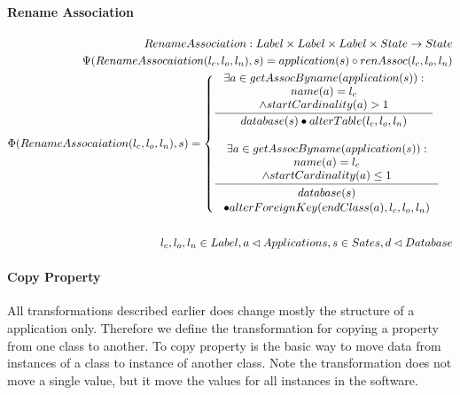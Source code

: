\documentclass[11pt]{article}
\begin{document}
\paragraph{Rename Association}
\begin{align*}
RenameAssociation : Label \times Label \times Label \times State \rightarrow State \\
\Psi(RenameAssocaiation(l_c, l_o, l_n), s) = application(s) \circ renAssoc(l_c, l_o, l_n)\\
\Phi(RenameAssocaiation(l_c, l_o, l_n), s) = \begin{cases}
	\inference{\exists a  \in getAssocByname(application(s)) : \\
  name(a) = l_c \\ \wedge startCardinality(a) > 1 }{database(s) \bullet alterTable(l_c, l_o, l_n)}
 \\ \\
  \inference{\exists a  \in getAssocByname(application(s)) : \\
  name(a) = l_c \\ \wedge startCardinality(a) \leq 1 }{\begin{gathered}
database(s) \\ \bullet alterForeignKey(endClass(a) ,l_c, l_o, l_n)
\end{gathered}}
 \end{cases}
\\\\
l_c, l_o, l_n \in Label, a \lhd Applications, s \in Sates, d \lhd Database
\end{align*}


\paragraph{Copy Property}
All transformations described earlier does change mostly the structure of a application only. Therefore we define  the transformation for copying a property from one class to another. To copy property is the basic way to move data from instances of a class to instance of another class. Note the transformation does not move a single value, but it move the values for all instances in the software.
\end{document}
